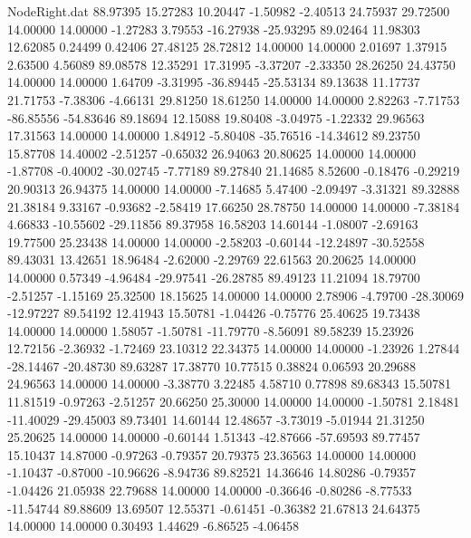 \begin{filecontents}{NodeRight.dat}
  88.97395   15.27283   10.20447    -1.50982   -2.40513   24.75937   29.72500   14.00000   14.00000   -1.27283    3.79553  -16.27938  -25.93295
  89.02464   11.98303   12.62085     0.24499    0.42406   27.48125   28.72812   14.00000   14.00000    2.01697    1.37915    2.63500    4.56089
  89.08578   12.35291   17.31995    -3.37207   -2.33350   28.26250   24.43750   14.00000   14.00000    1.64709   -3.31995  -36.89445  -25.53134
  89.13638   11.17737   21.71753    -7.38306   -4.66131   29.81250   18.61250   14.00000   14.00000    2.82263   -7.71753  -86.85556  -54.83646
  89.18694   12.15088   19.80408    -3.04975   -1.22332   29.96563   17.31563   14.00000   14.00000    1.84912   -5.80408  -35.76516  -14.34612
  89.23750   15.87708   14.40002    -2.51257   -0.65032   26.94063   20.80625   14.00000   14.00000   -1.87708   -0.40002  -30.02745   -7.77189
  89.27840   21.14685    8.52600    -0.18476   -0.29219   20.90313   26.94375   14.00000   14.00000   -7.14685    5.47400   -2.09497   -3.31321
  89.32888   21.38184    9.33167    -0.93682   -2.58419   17.66250   28.78750   14.00000   14.00000   -7.38184    4.66833  -10.55602  -29.11856
  89.37958   16.58203   14.60144    -1.08007   -2.69163   19.77500   25.23438   14.00000   14.00000   -2.58203   -0.60144  -12.24897  -30.52558
  89.43031   13.42651   18.96484    -2.62000   -2.29769   22.61563   20.20625   14.00000   14.00000    0.57349   -4.96484  -29.97541  -26.28785
  89.49123   11.21094   18.79700    -2.51257   -1.15169   25.32500   18.15625   14.00000   14.00000    2.78906   -4.79700  -28.30069  -12.97227
  89.54192   12.41943   15.50781    -1.04426   -0.75776   25.40625   19.73438   14.00000   14.00000    1.58057   -1.50781  -11.79770   -8.56091
  89.58239   15.23926   12.72156    -2.36932   -1.72469   23.10312   22.34375   14.00000   14.00000   -1.23926    1.27844  -28.14467  -20.48730
  89.63287   17.38770   10.77515     0.38824    0.06593   20.29688   24.96563   14.00000   14.00000   -3.38770    3.22485    4.58710    0.77898
  89.68343   15.50781   11.81519    -0.97263   -2.51257   20.66250   25.30000   14.00000   14.00000   -1.50781    2.18481  -11.40029  -29.45003
  89.73401   14.60144   12.48657    -3.73019   -5.01944   21.31250   25.20625   14.00000   14.00000   -0.60144    1.51343  -42.87666  -57.69593
  89.77457   15.10437   14.87000    -0.97263   -0.79357   20.79375   23.36563   14.00000   14.00000   -1.10437   -0.87000  -10.96626   -8.94736
  89.82521   14.36646   14.80286    -0.79357   -1.04426   21.05938   22.79688   14.00000   14.00000   -0.36646   -0.80286   -8.77533  -11.54744
  89.88609   13.69507   12.55371    -0.61451   -0.36382   21.67813   24.64375   14.00000   14.00000    0.30493    1.44629   -6.86525   -4.06458

\end{filecontents}
